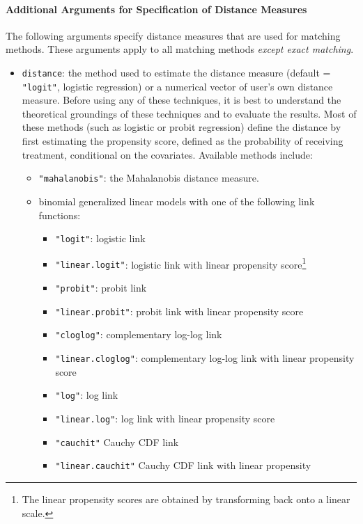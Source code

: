 \paragraph{Additional Arguments for Specification of
  Distance Measures}
\label{subsubsec:inputs-all}

The following arguments specify distance measures that are used for
matching methods. These arguments apply to all matching methods {\it
  except exact matching}.

\begin{itemize}
  
\item \texttt{distance}: the method used to estimate the distance
  measure (default = {\tt "logit"}, logistic regression) or a
  numerical vector of user's own distance measure.  Before using any
  of these techniques, it is best to understand the theoretical
  groundings of these techniques and to evaluate the results.  Most of
  these methods (such as logistic or probit regression) define the
  distance by first estimating the propensity score, defined as the
  probability of receiving treatment, conditional on the covariates.
  Available methods include:
  \begin{itemize}
  \item {\tt "mahalanobis"}: the Mahalanobis distance measure.
  \item binomial generalized linear models with one of the following
    link functions:
    \begin{itemize}
    \item \texttt{"logit"}: logistic link 
    \item {\tt "linear.logit"}: logistic link with linear propensity
      score\footnote{The linear propensity scores are obtained by
        transforming back onto a linear scale.}
    \item \texttt{"probit"}: probit link
    \item {\tt "linear.probit"}: probit link with linear propensity
      score
    \item {\tt "cloglog"}: complementary log-log link
    \item {\tt "linear.cloglog"}: complementary log-log link with linear
      propensity score
    \item {\tt "log"}: log link
    \item {\tt "linear.log"}: log link with linear propensity score
    \item {\tt "cauchit"} Cauchy CDF link
    \item {\tt "linear.cauchit"} Cauchy CDF link with linear propensity

\end{itemize}
\end{itemize}
\end{itemize}
